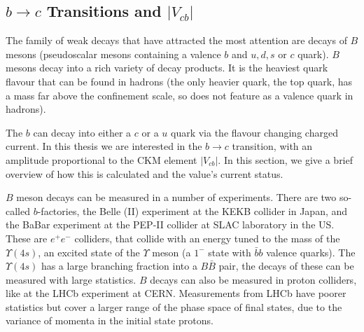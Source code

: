 \subsection{$b\to c$ Transitions and $|V_{cb}|$}

The family of weak decays that have attracted the most attention are decays of $B$ mesons (pseudoscalar mesons containing a valence $b$ and $u,d,s$ or $c$ quark). $B$ mesons decay into a rich variety of decay products. It is the heaviest quark flavour that can be found in hadrons (the only heavier quark, the top quark, has a mass far above the confinement scale, so does not feature as a valence quark in hadrons).

The $b$ can decay into either a $c$ or a $u$ quark via the flavour changing charged current. In this thesis we are interested in the $b\to c$ transition, with an amplitude proportional to the CKM element $|V_{cb}|$. In this section, we give a brief overview of how this is calculated and the value's current status.

$B$ meson decays can be measured in a number of experiments. There are two so-called $b$-factories, the Belle (II) experiment at the KEKB collider in Japan, and the BaBar experiment at the PEP-II collider at SLAC laboratory in the US. These are $e^+e^-$ colliders, that collide with an energy tuned to the mass of the $\Upsilon(4s)$, an excited state of the $\Upsilon$ meson (a $1^-$ state with $\bar{b}b$ valence quarks). The $\Upsilon(4s)$ has a large branching fraction into a $B\bar{B}$ pair, the decays of these can be measured with large statistics. $B$ decays can also be measured in proton colliders, like at the LHCb experiment at CERN. Measurements from LHCb have poorer statistics but cover a larger range of the phase space of final states, due to the variance of momenta in the initial state protons.

